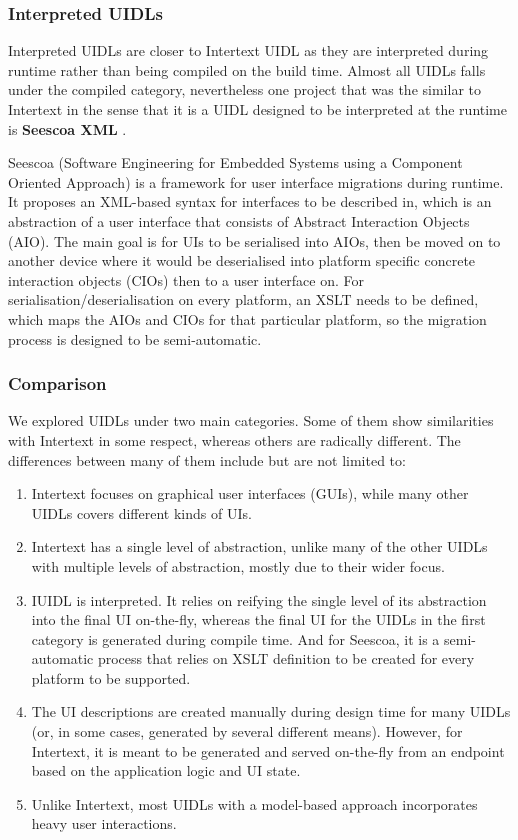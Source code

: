 \subsubsection{Interpreted UIDLs}

Interpreted UIDLs are closer to Intertext UIDL as they are interpreted during runtime rather than being compiled on the build time. Almost all UIDLs falls under the compiled category, nevertheless one project that was the similar to Intertext in the sense that it is a UIDL designed to be interpreted at the runtime is \textbf{Seescoa XML} \cite{seescoa}. 

Seescoa (Software Engineering for Embedded Systems using a Component Oriented Approach) is a framework for user interface migrations during runtime. It proposes an XML-based syntax for interfaces to be described in, which is an abstraction of a user interface that consists of Abstract Interaction Objects (AIO). The main goal is for UIs to be serialised into AIOs, then be moved on to another device where it would be deserialised into platform specific concrete interaction objects (CIOs) then to a user interface on. For serialisation/deserialisation on every platform, an XSLT needs to be defined, which maps the AIOs and CIOs for that particular platform, so the migration process is designed to be semi-automatic.

\subsubsection{Comparison}

We explored UIDLs under two main categories. Some of them show similarities with Intertext in some respect, whereas others are radically different. The differences between many of them include but are not limited to:

\begin{enumerate}
  \item Intertext focuses on graphical user interfaces (GUIs), while many other UIDLs covers different kinds of UIs.
  
  \item Intertext has a single level of abstraction, unlike many of the other UIDLs with multiple levels of abstraction, mostly due to their wider focus.
  
  \item IUIDL is interpreted. It relies on reifying the single level of its abstraction into the final UI on-the-fly, whereas the final UI for the UIDLs in the first category is generated during compile time. And for Seescoa, it is a semi-automatic process that relies on XSLT definition to be created for every platform to be supported.
  
  \item The UI descriptions are created manually during design time for many UIDLs (or, in some cases, generated by several different means). However, for Intertext, it is meant to be generated and served on-the-fly from an endpoint based on the application logic and UI state.
  
  \item Unlike Intertext, most UIDLs with a model-based approach incorporates heavy user interactions.
\end{enumerate}

